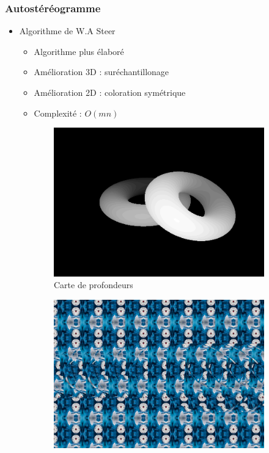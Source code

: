 \documentclass{beamer}
\begin{document}
%
\begin{frame}
\frametitle{Autostéréogramme}
\begin{itemize}[label=$\bullet$]
	\item Algorithme de W.A Steer \cite{wasteer}
	\begin{itemize}[label=$\circ$]
	\item Algorithme plus élaboré
	\item Amélioration 3D : suréchantillonage
	\item Amélioration 2D : coloration symétrique
	\item Complexité : $O(mn)$
	\end{itemize}
\end{itemize}
\begin{figure}
\centering
\begin{subfigure}{.4\textwidth}
  \centering
  \includegraphics[width=1\linewidth]{donutdepth.png}
  \caption{Carte de profondeurs}
\end{subfigure}
\begin{subfigure}{.4\textwidth}
  \centering
  \includegraphics[width=1\linewidth]{donut2.png}

\end{subfigure}
\end{figure}
\end{frame}
\end{document}
